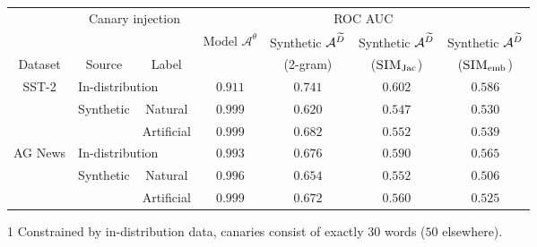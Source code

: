 \begin{threeparttable}
 \begin{tabular}{ccccccc}
    \toprule
     & \multicolumn{2}{c}{Canary injection} & \multicolumn{4}{c}{ROC AUC}\\
     \cmidrule(lr){2-3} \cmidrule(lr){4-7}
     &  &  & Model $\mathcal{A}^\theta$ & Synthetic $\mathcal{A}^{{\widetilde{D}}}$ & Synthetic $\mathcal{A}^{{\widetilde{D}}}$& Synthetic $\mathcal{A}^{{\widetilde{D}}}$\\
    Dataset & Source & Label &   & (2-gram) & ($\textsc{SIM}_\textrm{Jac}$) & ($\textsc{SIM}_\textrm{emb}$)\\
    \midrule
    \multirow{3}{*}{\parbox{1.8cm}{\centering SST-2}} & \multicolumn{2}{l}{In-distribution\tnote{1}} & $0.911$ & $0.741$ & $0.602$ & $0.586$ \\ 
    \cmidrule{2-7}
     & \multirow{2}{*}{\parbox{1.8cm}{Synthetic}} & Natural & $0.999$ & $0.620$ & $0.547$ & $0.530$ \\ 
     & & Artificial & $0.999$ & $0.682$ & $0.552$ & $0.539$ \\ 
    \midrule
    \multirow{3}{*}{\parbox{1.8cm}{\centering AG News}} & \multicolumn{2}{l}{In-distribution} & $0.993$ & $0.676$ & $0.590$ & $0.565$ \\ 
    \cmidrule{2-7} 
     & \multirow{2}{*}{\parbox{1.8cm}{Synthetic}} & Natural & $0.996$ & $0.654$ & $0.552$ & $0.506$ \\ 
     & & Artificial & $0.999$ & $0.672$ & $0.560$ & $0.525$ \\         
     \bottomrule
 \end{tabular}
    \begin{tablenotes}
    \item[1] Constrained by in-distribution data, canaries consist of exactly $30$ words ($50$ elsewhere).
    \end{tablenotes}
 \end{threeparttable}
 